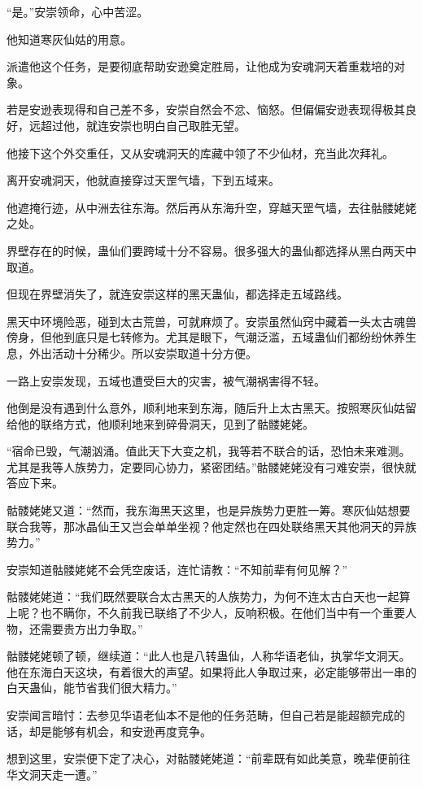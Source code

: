 \begin{this_body}
“是。”安崇领命，心中苦涩。

他知道寒灰仙姑的用意。

派遣他这个任务，是要彻底帮助安逊奠定胜局，让他成为安魂洞天着重栽培的对象。

若是安逊表现得和自己差不多，安崇自然会不忿、恼怒。但偏偏安逊表现得极其良好，远超过他，就连安崇也明白自己取胜无望。

他接下这个外交重任，又从安魂洞天的库藏中领了不少仙材，充当此次拜礼。

离开安魂洞天，他就直接穿过天罡气墙，下到五域来。

他遮掩行迹，从中洲去往东海。然后再从东海升空，穿越天罡气墙，去往骷髅姥姥之处。

界壁存在的时候，蛊仙们要跨域十分不容易。很多强大的蛊仙都选择从黑白两天中取道。

但现在界壁消失了，就连安崇这样的黑天蛊仙，都选择走五域路线。

黑天中环境险恶，碰到太古荒兽，可就麻烦了。安崇虽然仙窍中藏着一头太古魂兽傍身，但他到底只是七转修为。尤其是眼下，气潮泛滥，五域蛊仙们都纷纷休养生息，外出活动十分稀少。所以安崇取道十分方便。

一路上安崇发现，五域也遭受巨大的灾害，被气潮祸害得不轻。

他倒是没有遇到什么意外，顺利地来到东海，随后升上太古黑天。按照寒灰仙姑留给他的联络方式，他顺利地来到碎骨洞天，见到了骷髅姥姥。

“宿命已毁，气潮汹涌。值此天下大变之机，我等若不联合的话，恐怕未来难测。尤其是我等人族势力，定要同心协力，紧密团结。”骷髅姥姥没有刁难安崇，很快就答应下来。

骷髅姥姥又道：“然而，我东海黑天这里，也是异族势力更胜一筹。寒灰仙姑想要联合我等，那冰晶仙王又岂会单单坐视？他定然也在四处联络黑天其他洞天的异族势力。”

安崇知道骷髅姥姥不会凭空废话，连忙请教：“不知前辈有何见解？”

骷髅姥姥道：“我们既然要联合太古黑天的人族势力，为何不连太古白天也一起算上呢？也不瞒你，不久前我已联络了不少人，反响积极。在他们当中有一个重要人物，还需要贵方出力争取。”

骷髅姥姥顿了顿，继续道：“此人也是八转蛊仙，人称华语老仙，执掌华文洞天。他在东海白天这块，有着很大的声望。如果将此人争取过来，必定能够带出一串的白天蛊仙，能节省我们很大精力。”

安崇闻言暗忖：去参见华语老仙本不是他的任务范畴，但自己若是能超额完成的话，却是能够有机会，和安逊再度竞争。

想到这里，安崇便下定了决心，对骷髅姥姥道：“前辈既有如此美意，晚辈便前往华文洞天走一遭。”


\end{this_body}
